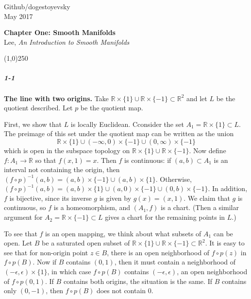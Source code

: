 \documentclass[10pt,letter]{article}
\begin{document}
\noindent Github/dogestoyevsky \\
May 2017
\begin{center}
\textbf{Chapter One: Smooth Manifolds}\\ Lee, \textit{An Introduction to Smooth Manifolds}

\line(1,0){250}
\end{center}
\subparagraph{1-1} \textbf{The line with two origins.} Take $\mathbb{R} \times \lbrace 1 \rbrace \cup \mathbb{R} \times \lbrace -1 \rbrace \subset \mathbb{R}^2$ and let $L$ be the quotient described. Let $p$ be the quotient map.  

First, we show that $L$ is locally Euclidean. Cconsider the set $A_1 = \mathbb{R} \times \lbrace 1 \rbrace \subset L$. The preimage of this set under the quotient map can be written as the union
\begin{equation*}
\mathbb{R} \times \lbrace 1 \rbrace  \cup (-\infty,0) \times \lbrace -1 \rbrace \cup (0,\infty) \times \lbrace -1 \rbrace
\end{equation*}
which is open in the subspace topology on $\mathbb{R} \times \lbrace 1 \rbrace \cup \mathbb{R} \times \lbrace -1 \rbrace$. Now define $f: A_1 \rightarrow \mathbb{R}$ so that $f(x,1) = x$. Then $f$ is continuous: if $(a,b) \subset A_1$ is an interval not containing the origin, then $(f \circ p)^{-1}(a,b) = (a,b) \times \lbrace -1 \rbrace \cup (a,b) \times \lbrace 1 \rbrace$. Otherwise, $(f \circ p)^{-1}(a,b) = (a,b) \times \lbrace 1 \rbrace \cup (a,0) \times \lbrace -1 \rbrace \cup (0,b) \times \lbrace -1 \rbrace$. In addition, $f$ is bijective, since its inverse $g$ is given by $g(x) = (x,1)$. We claim that $g$ is continuous, so $f$ is a homeomorphism, and $(A_1,f)$ is a chart. (Then a similar argument for $A_2 = \mathbb{R} \times \lbrace -1 \rbrace \subset L$ gives a chart for the remaining points in $L$.)

To see that $f$ is an open mapping, we think about what subsets of $A_1$ can be open. Let $B$ be a saturated open subset of $\mathbb{R} \times \lbrace 1 \rbrace \cup \mathbb{R} \times \lbrace -1 \rbrace \subset \mathbb{R}^2$. It is easy to see that for non-origin point $z \in B$, there is an open neighborhood of $f \circ p(z)$ in $f \circ p(B)$. Now if $B$ contains $(0,1)$, then it must contain a neighborhood of $(-\epsilon,\epsilon) \times \lbrace 1 \rbrace$, in which case $f \circ p(B)$ contains $(-\epsilon,\epsilon)$, an open neighborhood of $f \circ p(0,1)$. If $B$ contains both origins, the situation is the same. If $B$ contains only $(0,-1)$, then $f \circ p(B)$ does not contain $0$. 
\end{document}
